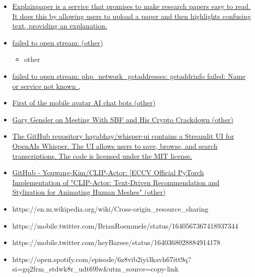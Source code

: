 \begin{itemize}
\begin{itemize}
    \begin{itemize}
     
    \item
    \end{itemize}
  \item
    \href{http://explainpaper.com}{Explainpaper is a service that
    promises to make research papers easy to read. It does this by
    allowing users to upload a paper and then highlights confusing text,
    providing an explanation.}
  \item
    \href{https://hongfz16.github.io/projects/avatarclip.html}{failed to
    open stream: (other)}

    \begin{itemize}
     
    \item
      other
    \end{itemize}
  \item
    \href{https://dex.bonfida.com/\#/market/e14bkbhdwd4eutkwj1oozezesgxmw8lpcps4w5puzzjo}{failed
    to open stream: php\_network\_getaddresses: getaddrinfo failed: Name
    or service not known ,}
  \item
    \href{https://www.d-id.com/chat/}{First of the mobile avatar AI chat
    bots (other)}
  \item
    \href{https://nymag.com/intelligencer/2023/02/gary-gensler-on-meeting-with-sbf-and-his-crypto-crackdown.html}{Gary
    Gensler on Meeting With SBF and His Crypto Crackdown (other)}
  \item
    \href{https://github.com/hayabhay/whisper-ui}{The GitHub repository
    hayabhay/whisper-ui contains a Streamlit UI for
    OpenAI\textquotesingle s Whisper. The UI allows users to save,
    browse, and search transcriptions. The code is licensed under the
    MIT license.}
  \item
    \href{https://github.com/youwang-kim/clip-actor}{GitHub -
    Youwang-Kim/CLIP-Actor: {[}ECCV\textquotesingle22{]} Official
    PyTorch Implementation of "CLIP-Actor: Text-Driven Recommendation
    and Stylization for Animating Human Meshes" (other)}
  \item
    https://en.m.wikipedia.org/wiki/Cross-origin\_resource\_sharing
  \item
    https://mobile.twitter.com/BrianRoemmele/status/1640567367418937344
  \item
    https://mobile.twitter.com/heyBarsee/status/1640368028884914178
  \item
    https://open.spotify.com/episode/6z8vib2iyi3kavh67itt9q?si=gq2frm\_stdwk8r\_udt69lw\&utm\_source=copy-link

\end{itemize}
\end{itemize}
